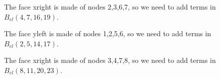The face xright is made of nodes 2,3,6,7, so we need 
to add terms in $B_{el}(4,7,16,19)$.

The face yleft is made of nodes 1,2,5,6, so we need 
to add terms in $B_{el}(2,5,14,17)$.

The face xright is made of nodes 3,4,7,8, so we need 
to add terms in $B_{el}(8,11,20,23)$.




